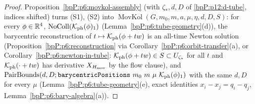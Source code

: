 \begin{proof}
\label{stepP:p12:pl-phys} Proposition~\ref{bpP:p6:movkol-assembly} (with $\zeta_*,d,D$ of \ref{bpP:p12:d-tube}, indices shifted) turns (S1), (S2) into $\operatorname{MovKol}(G,m_0,m,a,\mu,\eta,d,D,S)$: for every $\phi\in\mathbb{R}^4$, $\operatorname{NoColl}(\mathcal K_{\rm ph}(\phi)_1)$ (Lemma~\ref{bpP:p6:tube-geometry}(d)), the barycentric reconstruction of $t\mapsto\mathcal K_{\rm ph}(\phi+tw)$ is an all-time Newton solution (Proposition~\ref{bpP:p6:reconstruction} via Corollary~\ref{bpP:p6:orbit-transfer}(a), or Corollary~\ref{bpP:p6:newton-in-tube}: $\mathcal K_{\rm ph}(\phi+tw)\in S\subset U_{\zeta_*}$ for all $t$ and $\mathcal K_{\rm ph}(\cdot+tw)$ has derivative $X_{H_{\rm mov}}$ by the flow clause), and $\operatorname{PairBounds}(d,D;\texttt{barycentricPositions}\ m_0\ m\ \mu\ \mathcal K_{\rm ph}(\phi)_1)$ with the same $d,D$ for every $\mu$ (Lemma~\ref{bpP:p6:tube-geometry}(e), exact identities $x_i-x_j=q_i-q_j$, Lemma~\ref{bpP:p6:bary-algebra}(a)).
\end{proof}

